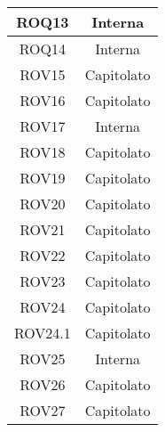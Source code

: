 \begin{longtable}{|c|c|}
\midrule
ROQ13
& Interna\\

\midrule
ROQ14
& Interna\\



\midrule
ROV15
& Capitolato\\

\midrule
ROV16
& Capitolato\\

\midrule
ROV17
& Interna\\

\midrule
ROV18
& Capitolato\\

\midrule
ROV19
& Capitolato\\

\midrule
ROV20
& Capitolato\\

\midrule
ROV21
& Capitolato\\

\midrule
ROV22
& Capitolato\\

\midrule
ROV23
& Capitolato\\

\midrule
ROV24
& Capitolato\\

\midrule
ROV24.1
& Capitolato\\

\midrule
ROV25
& Interna\\

\midrule
ROV26
& Capitolato\\

\midrule
ROV27
& Capitolato\\





\end{longtable}

\newpage
